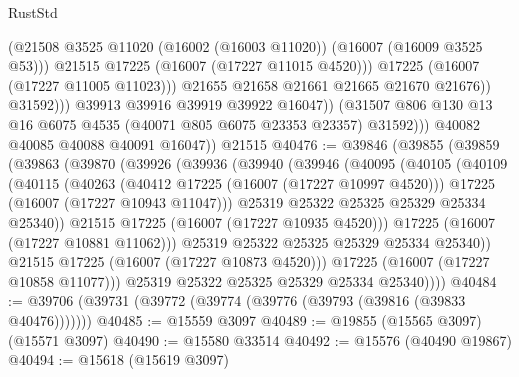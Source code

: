 \begin{lexlean}{RustStd}
\begin{coremodule}
                              (@21508
                                @3525
                                @11020
                                (@16002 (@16003 @11020))
                                (@16007 (@16009 @3525 @53)))
                              @21515
                              @17225
                              (@16007 (@17227 @11015 @4520)))
                            @17225
                            (@16007 (@17227 @11005 @11023)))
                          @21655
                          @21658
                          @21661
                          @21665
                          @21670
                          @21676))
                      @31592)))
                @39913
                @39916
                @39919
                @39922
                @16047))
            (@31507 @806 @130 @13 @16 @6075 @4535 (@40071 @805 @6075 @23353 @23357) @31592)))
        @40082
        @40085
        @40088
        @40091
        @16047))
    @21515
@40476 := @39846
    (@39855
      (@39859
        (@39863
          (@39870
            (@39926
              (@39936
                (@39940
                  (@39946
                    (@40095
                      (@40105
                        (@40109
                          (@40115
                            (@40263
                              (@40412 @17225 (@16007 (@17227 @10997 @4520)))
                              @17225
                              (@16007 (@17227 @10943 @11047)))
                            @25319
                            @25322
                            @25325
                            @25329
                            @25334
                            @25340))
                        @21515
                        @17225
                        (@16007 (@17227 @10935 @4520)))
                      @17225
                      (@16007 (@17227 @10881 @11062)))
                    @25319
                    @25322
                    @25325
                    @25329
                    @25334
                    @25340))
                @21515
                @17225
                (@16007 (@17227 @10873 @4520)))
              @17225
              (@16007 (@17227 @10858 @11077)))
            @25319
            @25322
            @25325
            @25329
            @25334
            @25340))))
@40484 := @39706 (@39731 (@39772 (@39774 (@39776 (@39793 (@39816 (@39833 @40476)))))))
@40485 := @15559 @3097
@40489 := @19855 (@15565 @3097) (@15571 @3097)
@40490 := @15580 @33514
@40492 := @15576 (@40490 @19867)
@40494 := @15618 (@15619 @3097)

\end{coremodule}
\end{lexlean}
